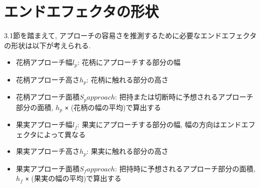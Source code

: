 \section{エンドエフェクタの形状}
3.1節を踏まえて, アプローチの容易さを推測するために必要なエンドエフェクタの形状は以下が考えられる.

\begin{itemize}
  \item 花柄アプローチ幅$l_p$: 花柄にアプローチする部分の幅
  \item 花柄アプローチ高さ$h_p$: 花柄に触れる部分の高さ
  \item 花柄アプローチ面積$S_papproach$: 把持または切断時に予想されるアプローチ部分の面積, $h_p$ \verb|×| (花柄の幅の平均)で算出する
  \item 果実アプローチ幅$l_f$: 果実にアプローチする部分の幅, 幅の方向はエンドエフェクタによって異なる
  \item 果実アプローチ高さ$h_p$: 果実に触れる部分の高さ
  \item 果実アプローチ面積$S_fapproach$: 把持時に予想されるアプローチ部分の面積, $h_f$ \verb|×| (果実の幅の平均)で算出する
\end{itemize}
